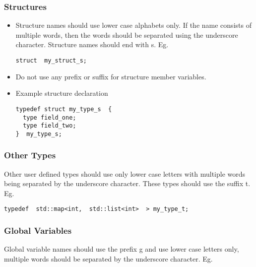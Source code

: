 \subsubsection{Structures}

\begin{itemize}

  \item Structure names should use lower case alphabets only. If the
name consists of multiple words, then the words should be separated
using the underscore character. Structure names should end with s. Eg.

\smallskip
\begin{lstlisting}
struct  my_struct_s;
\end{lstlisting}
\smallskip

  \item Do not use any prefix or suffix for structure member
  variables.

  \item Example structure declaration

\smallskip
\begin{lstlisting}
typedef struct my_type_s  {
  type field_one;
  type field_two;
}  my_type_s;
\end{lstlisting}
\smallskip

\end{itemize}





\subsubsection{Other Types}

Other user defined types should use only lower case letters with
multiple words being separated by the underscore character. These
types should use the suffix t.  Eg.

\smallskip
\begin{lstlisting}
typedef  std::map<int,  std::list<int>  > my_type_t;
\end{lstlisting}
\smallskip


\subsubsection{Global Variables}

Global variable names should use the prefix g and use lower case
letters only, multiple words should be separated by the underscore
character.  Eg.

